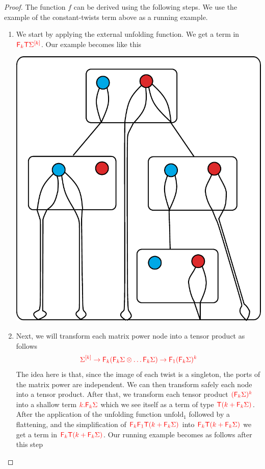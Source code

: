 \begin{proof}
The function $f$ can be derived using the following steps. We use the example of the constant-twists term above as a running example.  
\begin{enumerate}
\item We start by applying the external unfolding function.  We get a term in ${\color{red}{{\color{red}{\mathsf F_{k}}}{\color{red}{\mathsf T}}\Sigma^{[k]}}}$. Our example becomes like this
   \begin{center}
\includegraphics[scale=.35]{pictures/one-unfold1.pdf}
 \end{center}
 \item Next, we will transform each matrix power node into a tensor product as follows 
 \begin{align*}
 {\color{red}{ \Sigma^{[k]} \rightarrow {\color{red}{\mathsf F_{k}}}({\color{red}{\mathsf F_{k}}}\Sigma \otimes \dots {\color{red}{\mathsf F_{k}}}\Sigma) \to {\color{red}{\mathsf F_{1}}}({\color{red}{\mathsf F_{k}}}\Sigma)^k}}
 \end{align*}
 The idea here is that, since the image of each twist is a singleton,  the ports of the matrix power are independent. We can then transform safely each node into a tensor product. After that, we transform each tensor product ${\color{red}{({\color{red}{\mathsf F_{k}}}\Sigma)^k}}$ into a shallow term ${\color{red}{k.{\color{red}{\mathsf F_{k}}}\Sigma}}$ which we see itself as a term of type ${\color{red}{{\color{red}{\mathsf T}}(k+{\color{red}{\mathsf F_{k}}}\Sigma)}}$. After the application of the unfolding function $\mathrm{unfold}_1$ followed by a flattening, and the simplification of ${\color{red}{{\color{red}{\mathsf F_{k}}}{\color{red}{\mathsf F_{1}}}{\color{red}{\mathsf T}}(k+{\color{red}{\mathsf F_{k}}}\Sigma)}}$ into ${\color{red}{{\color{red}{\mathsf F_{k}}}{\color{red}{\mathsf T}}(k+{\color{red}{\mathsf F_{k}}}\Sigma)}}$ we get a term in ${\color{red}{{\color{red}{\mathsf F_{k}}}{\color{red}{\mathsf T}}(k+{\color{red}{\mathsf F_{k}}}\Sigma)}}$. Our running example becomes as follows after this step

\end{enumerate}
\end{proof}
